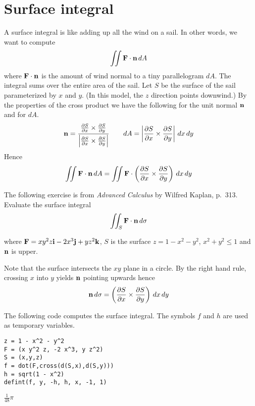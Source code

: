 \documentclass[12pt]{article}
\begin{document}
\section*{Surface integral}

A surface integral is like adding up all the wind on a sail.
In other words, we want to compute
$$\int\!\!\!\int{\bf F\cdot n}\,dA$$
where ${\bf F\cdot n}$ is the amount of wind normal to a tiny parallelogram $dA$.
The integral sums over the entire area of the sail.
Let $S$ be the surface of the sail parameterized by $x$ and $y$.
(In this model, the $z$ direction points downwind.)
By the properties of the cross product we have the following for the unit normal $\bf n$
and for $dA$.
$${\bf n}=\frac{{\frac{\partial S}{\partial x}\times\frac{\partial S}{\partial y}}}
{{\left|\frac{\partial S}{\partial x}\times\frac{\partial S}{\partial y}\right|}}\qquad
dA=\left|\frac{\partial S}{\partial x}\times\frac{\partial S}{\partial y}\right|\,dx\,dy$$
Hence
$$\int\!\!\!\int{\bf F\cdot n}\,dA=\int\!\!\!\int{\bf F}\cdot
\left({\frac{\partial S}{\partial x}\times\frac{\partial S}{\partial y}}\right)\,dx\,dy$$

\bigskip
The following exercise is from
{\it Advanced Calculus} by Wilfred Kaplan, p.~313.
Evaluate the surface integral
$$\int\!\!\!\int_S{\bf F\cdot n}\,d\sigma$$

where ${\bf F}=xy^2z{\bf i}-2x^3{\bf j}+yz^2{\bf k}$, $S$ is the surface
$z=1-x^2-y^2$, $x^2+y^2\le1$ and $\bf n$ is upper.

\bigskip
Note that the surface intersects the $xy$ plane in a circle.
By the right hand rule, crossing $x$ into $y$ yields $\bf n$ pointing upwards hence
$${\bf n}\,d\sigma=\left({\frac{\partial S}{\partial x}\times\frac{\partial S}{\partial y}}\right)\,dx\,dy$$

The following code computes the surface integral.
The symbols $f$ and $h$ are used as temporary variables.

{\color{blue}
\begin{verbatim}
z = 1 - x^2 - y^2
F = (x y^2 z, -2 x^3, y z^2)
S = (x,y,z)
f = dot(F,cross(d(S,x),d(S,y)))
h = sqrt(1 - x^2)
defint(f, y, -h, h, x, -1, 1)
\end{verbatim}
}

$\displaystyle \tfrac{1}{48}\pi$
\end{document}
